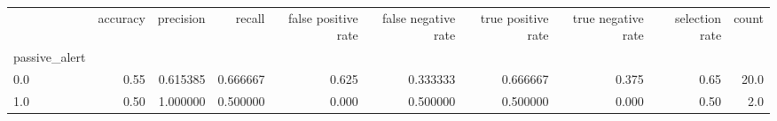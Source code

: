 \begin{tabular}{lrrrrrrrrr}
\toprule
{} &  accuracy &  precision &    recall &  false positive rate &  false negative rate &  true positive rate &  true negative rate &  selection rate &  count \\
passive\_alert &           &            &           &                      &                      &                     &                     &                 &        \\
\midrule
0.0           &      0.55 &   0.615385 &  0.666667 &                0.625 &             0.333333 &            0.666667 &               0.375 &            0.65 &   20.0 \\
1.0           &      0.50 &   1.000000 &  0.500000 &                0.000 &             0.500000 &            0.500000 &               0.000 &            0.50 &    2.0 \\
\bottomrule
\end{tabular}
